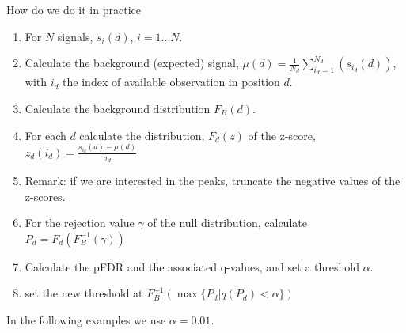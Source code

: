 \documentclass[8pt]{beamer}
\begin{document}
\begin{frame}{How do we do it in practice}
\begin{enumerate}
\item For $N$ signals, $s_i(d)$, $i=1...N$. 
\item Calculate the background (expected) signal, $\mu(d)=\frac{1}{N_d}\sum_{i_d=1}^{N_d}(s_{i_d}(d))$, with $i_d$ the index of available observation in position $d$.
\item Calculate the background distribution $F_B(d)$. 
\item For each $d$ calculate the distribution, $F_d(z)$ of the z-score, $z_d(i_d)=\frac{s_{i_d}(d)-\mu(d)}{\sigma_d}$
\item Remark: if we are interested in the peaks, truncate the negative values of the z-scores.
\item For the rejection value $\gamma$ of the null distribution, calculate $P_d = F_d(F_B^{-1}(\gamma))$
\item Calculate the pFDR and the associated q-values, and set a threshold $\alpha$.
\item set the new threshold at $F_B^{-1}(\max\{P_d| q(P_d)<\alpha\})$
\end{enumerate}
In the following examples we use $\alpha=0.01$. 
\end{frame}
\end{document}
